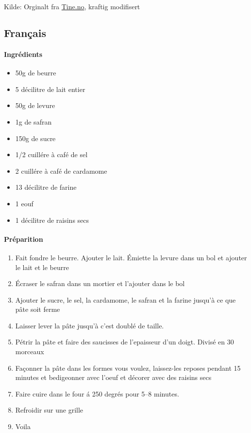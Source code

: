Kilde: Orginalt fra \href{http://www.tine.no/oppskrifter/bakst/sot-gjarbakst/lussekatter}{Tine.no}, kraftig modifisert


\subsection{Français}
\paragraph{Ingrédients}
\begin{itemize}[noitemsep]
	\item 50g de beurre
	\item 5 décilitre de lait entier
	\item 50g de levure
	\item 1g de safran
	\item 150g de sucre
	\item 1/2 cuillére à café de sel
	\item 2 cuillére à café de cardamome
	\item 13 décilitre de farine
	\item 1 eouf
	\item 1 décilitre de raisins secs
\end{itemize}

\paragraph{Préparition}
\begin{enumerate}[noitemsep]
	\item Fait fondre le beurre. Ajouter le lait. Émiette la levure dans un bol et ajouter le lait et le beurre
	\item Écraser le safran dans un mortier et l'ajouter  dans le bol
	\item Ajouter le sucre, le sel, la cardamome, le safran et la farine jusqu'à ce que pâte soit ferme
	\item Laisser lever la pâte jusqu'à c'est doublé de taille.
	\item Pétrir la pâte et faire des saucisses de l'epaisseur d'un doigt. Divisé en 30 morceaux
	\item Façonner la pâte dans les formes vous voulez, laissez-les reposes pendant 15 minutes et bedigeonner avec l'oeuf et décorer avec des raisins secs
	\item Faire cuire dans le four á 250 degrés pour 5--8 minutes.
	\item Refroidir sur une grille
	\item Voila
\end{enumerate}


